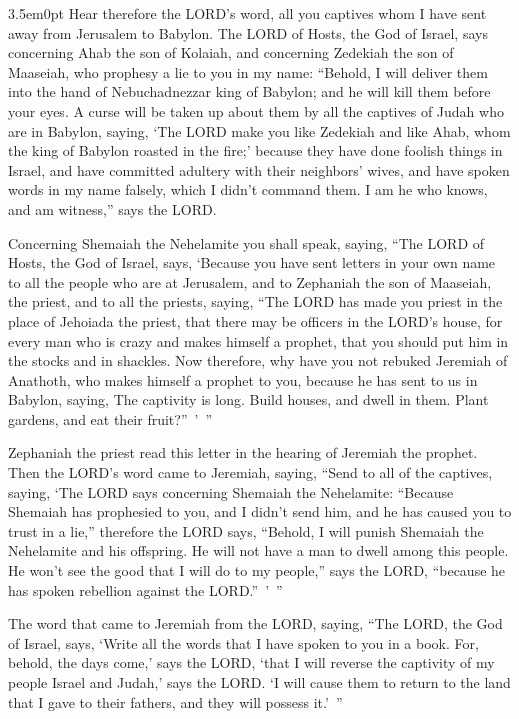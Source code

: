 \begin{adjustwidth}{3.5em}{0pt}
\myverse{}Hear therefore the LORD’s word, all you captives whom I have sent away from Jerusalem to Babylon.	\myverse{}The LORD of Hosts, the God of Israel, says concerning Ahab the son of Kolaiah, and concerning Zedekiah the son of Maaseiah, who prophesy a lie to you in my name: “Behold, I will deliver them into the hand of Nebuchadnezzar king of Babylon; and he will kill them before your eyes. \myverse{}A curse will be taken up about them by all the captives of Judah who are in Babylon, saying, ‘The LORD make you like Zedekiah and like Ahab, whom the king of Babylon roasted in the fire;’	\myverse{}because they have done foolish things in Israel, and have committed adultery with their neighbors’ wives, and have spoken words in my name falsely, which I didn’t command them. I	am he who knows, and am witness,” says the LORD.
\end{adjustwidth}			
			
\myverse{}Concerning Shemaiah the Nehelamite you shall speak, saying, \myverse{}“The LORD of Hosts, the God of Israel, says, ‘Because you have sent letters in your own name to all the people who are at Jerusalem, and to Zephaniah the son of Maaseiah, the priest, and to all the priests, saying, \myverse{}“The LORD has made you priest in the place of Jehoiada the priest, that there may be officers in the LORD’s house, for every man who is crazy and makes himself a prophet, that you should put him in the stocks and in shackles. \myverse{}Now therefore, why have you not rebuked Jeremiah of Anathoth, who makes himself a prophet to you, \myverse{}because he has sent to us in Babylon, saying, The captivity is long. Build houses, and dwell in them. Plant gardens, and eat their fruit?” ’ ”
			
			
\myverse{}Zephaniah the priest read this letter in the hearing of Jeremiah the prophet. \myverse{}Then the LORD’s word came to Jeremiah, saying, \myverse{}“Send to all of the captives, saying, ‘The LORD says concerning Shemaiah the Nehelamite: “Because Shemaiah has prophesied to you, and I didn’t send him, and he has caused you to trust in a lie,” \myverse{}therefore the LORD says, “Behold, I will punish Shemaiah the Nehelamite and his offspring. He will not have a man to dwell among this people. He won’t see the good that I will do to my people,” says the LORD, “because he has spoken rebellion against the LORD.” ’ ”
			
			
\mychapter{} \myverse*{}The word that came to Jeremiah from the LORD, saying, \myverse{}“The LORD, the God of Israel, says, ‘Write all the words that I have spoken to you in a book. \myverse{}For, behold, the days come,’ says the LORD, ‘that I will reverse the captivity of my people Israel and Judah,’ says the LORD. ‘I will cause them to return to the land that I gave to their fathers, and they will possess it.’ ”
			
